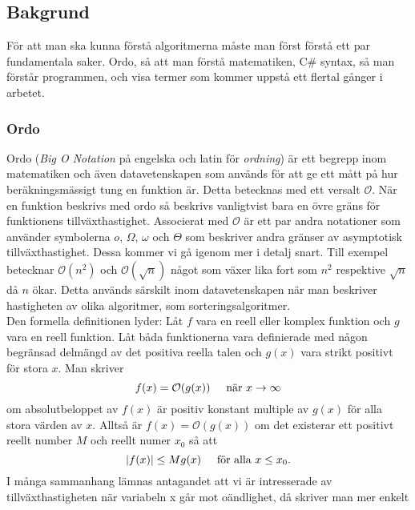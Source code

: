 \documentclass[twocolumn, a4, twoside]{article}
\begin{document}
\subsection{Bakgrund}
För att man ska kunna förstå algoritmerna måste man först förstå ett par fundamentala saker. Ordo, så att man förstå matematiken, C\# syntax, så man förstår programmen, och visa termer som kommer uppstå ett flertal gånger i arbetet.%
\subsubsection{Ordo}
Ordo (\textit{Big O Notation} på engelska och latin för \textit{ordning}) är ett begrepp inom matematiken och även datavetenskapen som används för att ge ett mått på hur beräkningsmässigt tung en funktion är. Detta betecknas med ett versalt $\mathcal{O}$. När en funktion beskrivs med ordo så beskrivs vanligtvist bara en övre gräns för funktionens tillväxthastighet. Associerat med $\mathcal{O}$ är ett par andra notationer som använder symbolerna $o$, $\Omega$, $\omega$ och $\Theta$ som beskriver andra gränser av asymptotisk tillväxthastighet. Dessa kommer vi gå igenom mer i detalj snart. Till exempel betecknar $\mathcal{O}(n^2)$ och $\mathcal{O}(\sqrt{n})$ något som växer lika fort som $n^2$ respektive $\sqrt{n}$ då $n$ ökar. Detta används särskilt inom datavetenskapen när man beskriver hastigheten av olika algoritmer, som sorteringsalgoritmer. \cite{4, 5}\\
Den formella definitionen lyder: Låt $f$ vara en reell eller komplex funktion och $g$ vara en reell funktion. Låt båda funktionerna vara definierade med någon begränsad delmängd av det positiva reella talen och $g(x)$ vara strikt positivt för stora $x$. Man skriver \cite{6}
\begin{equation*}
    f(x)=\mathcal{O}(g(x))\hspace{5mm}\text{när }x\rightarrow\infty
\end{equation*}
om absolutbeloppet av $f(x)$ är positiv konstant multiple av $g(x)$ för alla stora värden av $x$. Alltså är $f(x)=\mathcal{O}(g(x))$ om det existerar ett positivt reellt number $M$ och reellt numer $x_0$ så att
\begin{equation*}
    |f(x)|\leq Mg(x)\hspace{5mm}\text{för alla }x\leq x_0.
\end{equation*}
I många sammanhang lämnas antagandet att vi är intresserade av tillväxthastigheten när variabeln x går mot oändlighet, då skriver man mer enkelt
\end{document}
